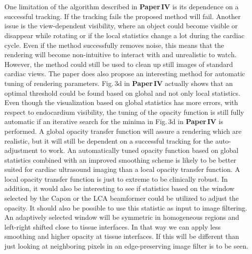\\\\
One limitation of the algorithm described in \textbf{Paper\,IV} is its dependence on a successful tracking. If the tracking fails the proposed method will fail.  Another issue is the view-dependent visibility, where an object could become visible or disappear while rotating or if the local statistics change a lot during the cardiac cycle. Even if the method successfully removes noise, this means that the rendering will become non-intuitive to interact with and unrealistic to watch. However, the method could still be used to clean up still images of standard cardiac views. The paper does also propose an interesting method for automatic tuning of rendering parameters. Fig.\,3d in \textbf{Paper\,IV} actually shows that an optimal threshold could be found based on global and not only local statistics. Even though the visualization based on global statistics has more errors, with respect to endocardium visibility, the tuning of the opacity function is still fully automatic if an iterative search for the minima in Fig.\,3d in \textbf{Paper\,IV} is performed. A global opacity transfer function will assure a rendering which are realistic, but it will still be dependent on a successful tracking for the auto-adjustment to work. An automatically tuned opacity function based on global statistics combined with an improved smoothing scheme is likely to be better suited for cardiac ultrasound imaging than a local opacity transfer function. A local opacity transfer function is just to extreme to be clinically robust. In addition, it would also be interesting to see if statistics based on the window selected by the Capon or the LCA beamformer could be utilized to adjust the opacity. It should also be possible to use this statistic as input to image filtering. An adaptively selected window will be symmetric in homogeneous regions and left-right shifted close to tissue interfaces. In that way we can apply less smoothing and higher opacity at tissue interfaces. If this will be different than just looking at neighboring pixels in an edge-preserving image filter is to be seen.
\\\\
